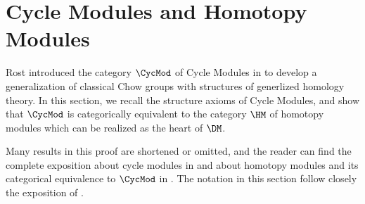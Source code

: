 \newpage
\section{Cycle Modules and Homotopy Modules}\label{sect_cycmod_and_hm}

Rost introduced the category $\CycMod$ of Cycle Modules in 
\cite{Rost96} to develop a generalization of classical Chow groups 
with structures of generlized homology theory. In this section, we 
recall the structure axioms of Cycle Modules, and show that
$\CycMod$ is categorically equivalent to the category $\HM$ of 
homotopy modules which can be realized as the heart of $\DM$.

Many results in this proof are shortened or omitted, and the 
reader can find the complete exposition about cycle modules in 
\cite{Rost96} and about homotopy modules and its categorical 
equivalence to $\CycMod$ in \cite{DegModHom}. The notation in this
section follow closely the exposition of \cite{Rost96}.

